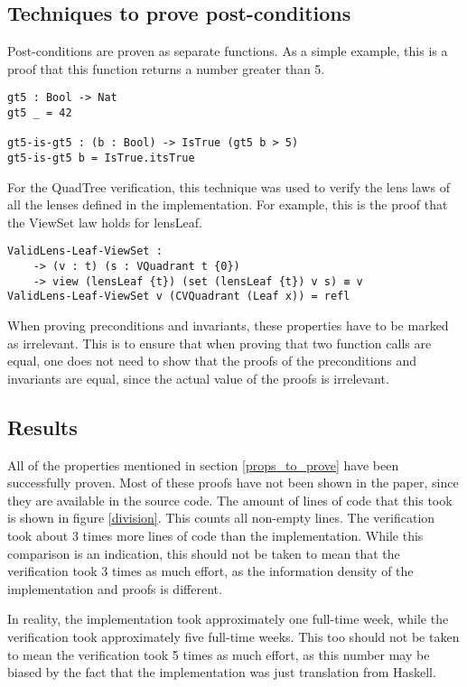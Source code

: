 \subsection{Techniques to prove post-conditions}
Post-conditions are proven as separate functions. As a simple example, this is a proof that this function returns a number greater than 5.
\begin{verbatim}
gt5 : Bool -> Nat
gt5 _ = 42

gt5-is-gt5 : (b : Bool) -> IsTrue (gt5 b > 5)
gt5-is-gt5 b = IsTrue.itsTrue
\end{verbatim}

For the QuadTree verification, this technique was used to verify the lens laws of all the lenses defined in the implementation. For example, this is the proof that the ViewSet law holds for lensLeaf.
\begin{verbatim}
ValidLens-Leaf-ViewSet : 
    -> (v : t) (s : VQuadrant t {0}) 
    -> view (lensLeaf {t}) (set (lensLeaf {t}) v s) ≡ v
ValidLens-Leaf-ViewSet v (CVQuadrant (Leaf x)) = refl
\end{verbatim}

When proving preconditions and invariants, these properties have to be marked as irrelevant. This is to ensure that when proving that two function calls are equal, one does not need to show that the proofs of the preconditions and invariants are equal, since the actual value of the proofs is irrelevant.

\subsection{Results}
All of the properties mentioned in section \ref{props_to_prove} have been successfully proven. Most of these proofs have not been shown in the paper, since they are available in the source code. The amount of lines of code that this took is shown in figure \ref{division}.  This counts all non-empty lines. The verification took about 3 times more lines of code than the implementation. While this comparison is an indication, this should not be taken to mean that the verification took 3 times as much effort, as the information density of the implementation and proofs is different.

In reality, the implementation took approximately one full-time week, while the verification took approximately five full-time weeks. This too should not be taken to mean the verification took 5 times as much effort, as this number may be biased by the fact that the implementation was just translation from Haskell.

